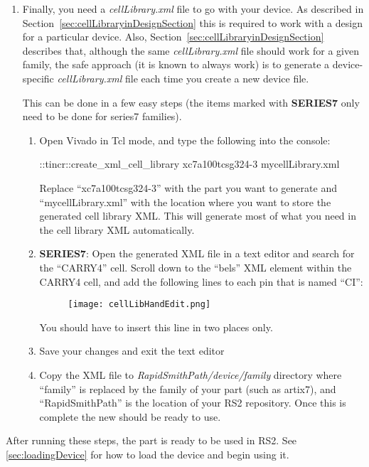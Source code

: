 \begin {enumerate}
\item Finally, you need a   \textit{cellLibrary.xml} file to go with your
device.  As described in Section~\ref{sec:cellLibraryinDesignSection} this is
required to work with a design for a particular device.  Also, 
Section~\ref{sec:cellLibraryinDesignSection} describes that, although the same 
\textit{cellLibrary.xml} file should work for a given family, the safe approach
(it is known to always work) is to generate a device-specific
\textit{cellLibrary.xml} file each time you create a new device file.

This can be done in a few easy steps (the
items marked with \textbf{SERIES7} only need to be done for series7 families).

\begin{enumerate}
  \item Open Vivado in Tcl mode, and type the following into the console:
  \begin{code}
::tincr::create_xml_cell_library xc7a100tcsg324-3 mycellLibrary.xml
  \end{code}
  Replace ``xc7a100tcsg324-3'' with the part you want to generate and
  ``mycellLibrary.xml'' with the location where you want to store the generated
  cell library XML. This will generate most of what you need in the cell library
  XML automatically.
  \item \textbf{SERIES7}: Open the generated XML file in a text editor and
  search for the ``CARRY4'' cell. Scroll down to the ``bels'' XML element within
  the CARRY4 cell, and add the following lines to each pin that is named ``CI'':
  
  \begin{figure}[H]
   \centering
   \texttt{[image: cellLibHandEdit.png]}
  \end{figure}
  
  You should have to insert this line in two places only.
  \item Save your changes and exit the text editor
  \item Copy the XML file to \textit{RapidSmithPath/device/family}
  directory where ``family'' is replaced by the family of your part (such as
  artix7), and ``RapidSmithPath'' is the location of your RS2 repository.
  Once this is complete the new  should be ready to use. 
\end{enumerate}

\end{enumerate}


\noindent After running these steps, the part is ready to be used in RS2.
See \autoref{sec:loadingDevice} for how to load the device and begin using it.

